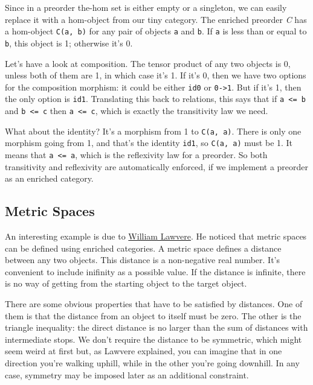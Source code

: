 Since in a preorder the-hom set is either empty or a singleton, we can
easily replace it with a hom-object from our tiny category. The enriched
preorder \emph{C} has a hom-object \texttt{C(a,\ b)} for any pair of
objects \texttt{a} and \texttt{b}. If \texttt{a} is less than or equal
to \texttt{b}, this object is 1; otherwise it's 0.

Let's have a look at composition. The tensor product of any two objects
is 0, unless both of them are 1, in which case it's 1. If it's 0, then
we have two options for the composition morphism: it could be either
\texttt{id0} or \texttt{0-\textgreater{}1}. But if it's 1, then the only
option is \texttt{id1}. Translating this back to relations, this says
that if \texttt{a\ \textless{}=\ b} and \texttt{b\ \textless{}=\ c} then
\texttt{a\ \textless{}=\ c}, which is exactly the transitivity law we
need.

What about the identity? It's a morphism from 1 to \texttt{C(a,\ a)}.
There is only one morphism going from 1, and that's the identity
\texttt{id1}, so \texttt{C(a,\ a)} must be 1. It means that
\texttt{a\ \textless{}=\ a}, which is the reflexivity law for a
preorder. So both transitivity and reflexivity are automatically
enforced, if we implement a preorder as an enriched category.

\subsection{Metric Spaces}\label{metric-spaces}

An interesting example is due to
\href{http://www.tac.mta.ca/tac/reprints/articles/1/tr1.pdf}{William
Lawvere}. He noticed that metric spaces can be defined using enriched
categories. A metric space defines a distance between any two objects.
This distance is a non-negative real number. It's convenient to include
inifinity as a possible value. If the distance is infinite, there is no
way of getting from the starting object to the target object.

There are some obvious properties that have to be satisfied by
distances. One of them is that the distance from an object to itself
must be zero. The other is the triangle inequality: the direct distance
is no larger than the sum of distances with intermediate stops. We don't
require the distance to be symmetric, which might seem weird at first
but, as Lawvere explained, you can imagine that in one direction you're
walking uphill, while in the other you're going downhill. In any case,
symmetry may be imposed later as an additional constraint.

